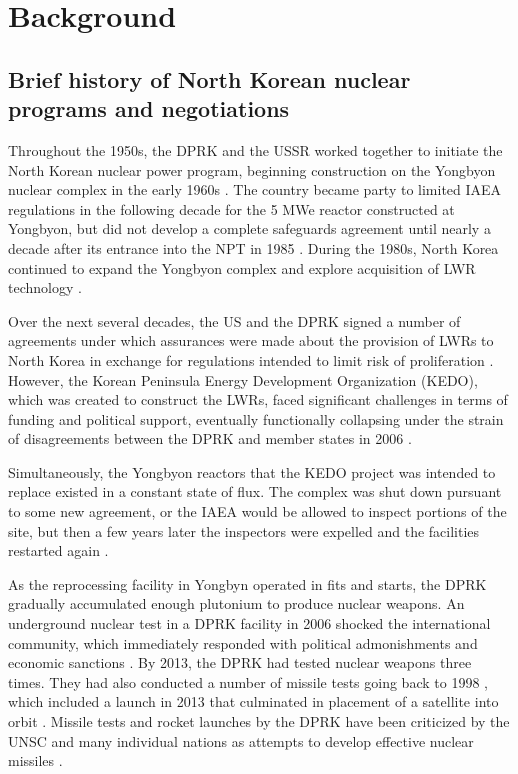 \chapter{Background}

\section{Brief history of North Korean nuclear programs and negotiations}

Throughout the 1950s, the DPRK and the USSR worked together to initiate the North Korean nuclear power program, beginning construction on the Yongbyon nuclear complex in the early 1960s \cite{nti15}. The country became party to limited IAEA regulations in the following decade for the 5 MWe reactor constructed at Yongbyon, but did not develop a complete safeguards agreement until nearly a decade after its entrance into the NPT in 1985 \cite{iaea09}. During the 1980s, North Korea continued to expand the Yongbyon complex and explore acquisition of LWR technology \cite{ntiYongbyon}.

Over the next several decades, the US and the DPRK signed a number of agreements under which assurances were made about the provision of LWRs to North Korea in exchange for regulations intended to limit risk of proliferation \cite{agreed, davenport}. However, the Korean Peninsula Energy Development Organization (KEDO), which was created to construct the LWRs, faced significant challenges in terms of funding and political support, eventually functionally collapsing under the strain of disagreements between the DPRK and member states in 2006 \cite{kedohist}.

Simultaneously, the Yongbyon reactors that the KEDO project was intended to replace existed in a constant state of flux. The complex was shut down pursuant to some new agreement, or the IAEA would be allowed to inspect portions of the site, but then a few years later the inspectors were expelled and the facilities restarted again \cite{davenport,nti15,iaea09}.

As the reprocessing facility in Yongbyn operated in fits and starts, the DPRK gradually accumulated enough plutonium to produce nuclear weapons. An underground nuclear test in a DPRK facility in 2006 shocked the international community, which immediately responded with political admonishments and economic sanctions \cite{davenport}. By 2013, the DPRK had tested nuclear weapons three times. They had also conducted a number of missile tests going back to 1998 \cite{orfall}, which included a launch in 2013 that culminated in placement of a satellite into orbit \cite{davenport}. Missile tests and rocket launches by the DPRK have been criticized by the UNSC and many individual nations as attempts to develop effective nuclear missiles \cite{unApr12}.


